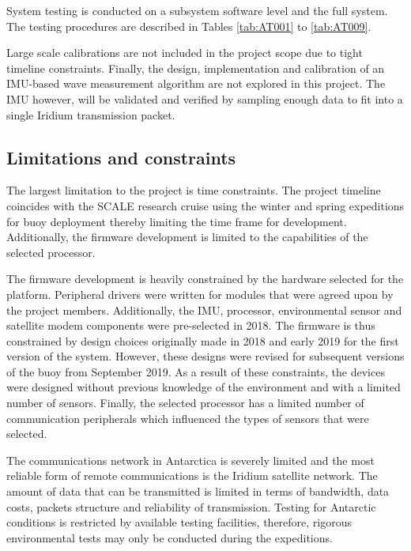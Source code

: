 System testing is conducted on a subsystem software level and the full system. The testing procedures are described in Tables \ref{tab:AT001} to \ref{tab:AT009}. 

Large scale calibrations are not included in the project scope due to tight timeline constraints. Finally, the  design, implementation and calibration of an IMU-based wave measurement algorithm are not explored in this project. The IMU however, will be validated and verified by sampling enough data to fit into a single Iridium transmission packet. 

\subsection{Limitations and constraints}

The largest limitation to the project is time constraints. The project timeline coincides with the SCALE research cruise using the winter and spring expeditions for buoy deployment thereby limiting the time frame for development. Additionally, the firmware development is limited to the capabilities of the selected processor. \par 

The firmware development is heavily constrained by the hardware selected for the platform. Peripheral drivers were written for modules that were agreed upon by the project members. Additionally, the IMU, processor, environmental sensor and satellite modem components were pre-selected in 2018. The firmware is thus constrained by design choices originally made in 2018 and early 2019 for the first version of the system. However, these designs were revised for subsequent versions of the buoy from September 2019. As a result of these constraints, the devices were designed without previous knowledge of the environment and with a limited number of sensors.  Finally, the selected processor has a limited number of communication peripherals which influenced the types of sensors that were selected.

The communications network in Antarctica is severely limited and the most reliable form of remote communications is the Iridium satellite network. The amount of data that can be transmitted is limited in terms of bandwidth, data costs, packets structure and reliability of transmission. Testing for Antarctic conditions is restricted by available testing facilities, therefore, rigorous environmental tests may only be conducted during the expeditions.\par 

